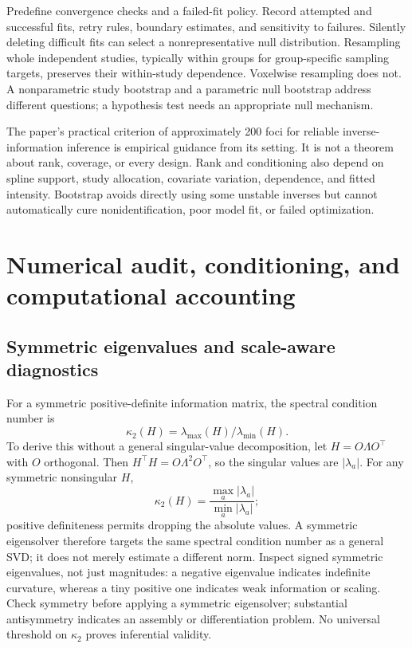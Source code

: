 \documentclass[11pt,a4paper]{article}
\numberwithin{equation}{section}
\begin{document}
Predefine convergence checks and a failed-fit policy.
Record attempted and successful fits, retry rules, boundary estimates,
and sensitivity to failures. Silently deleting difficult fits can select
a nonrepresentative null distribution.
Resampling whole independent studies, typically within groups for
group-specific sampling targets, preserves their within-study dependence.
Voxelwise resampling does not.
A nonparametric study bootstrap and a parametric null bootstrap address
different questions; a hypothesis test needs an appropriate null mechanism.

The paper's practical criterion of approximately 200 foci for reliable
inverse-information inference is empirical guidance from its setting.
It is not a theorem about rank, coverage, or every design.
Rank and conditioning also depend on spline support, study allocation,
covariate variation, dependence, and fitted intensity.
Bootstrap avoids directly using some unstable inverses but cannot
automatically cure nonidentification, poor model fit, or failed optimization.

\section{Numerical audit, conditioning, and computational accounting}
\label{sec:numerics}

\subsection{Symmetric eigenvalues and scale-aware diagnostics}
For a symmetric positive-definite information matrix, the spectral
condition number is
\begin{equation}
 \kappa_2(H)=\lambda_{\max}(H)/\lambda_{\min}(H).
\end{equation}
To derive this without a general singular-value decomposition, let
$H=O\Lambda O^\top$ with $O$ orthogonal. Then
$H^\top H=O\Lambda^2O^\top$, so the singular values are
$|\lambda_a|$. For any symmetric nonsingular $H$,
\[
 \kappa_2(H)=\frac{\max_a|\lambda_a|}{\min_a|\lambda_a|};
\]
positive definiteness permits dropping the absolute values.
A symmetric eigensolver therefore targets the same spectral condition
number as a general SVD; it does not merely estimate a different norm.
Inspect signed symmetric eigenvalues, not just magnitudes: a negative
eigenvalue indicates indefinite curvature, whereas a tiny positive one
indicates weak information or scaling. Check symmetry before applying a
symmetric eigensolver; substantial antisymmetry indicates an assembly or
differentiation problem.
No universal threshold on $\kappa_2$ proves inferential validity.
\end{document}
